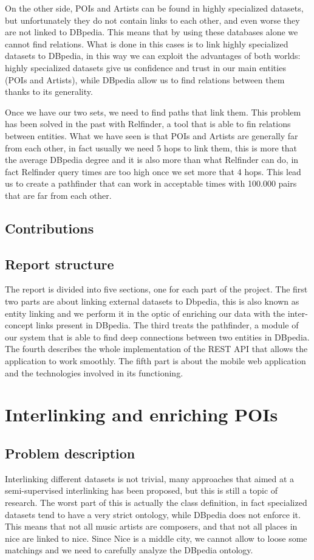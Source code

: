 On the other side, POIs and Artists can be found in highly specialized datasets, but unfortunately they do not contain links to each other, and even worse they are not linked to DBpedia. This means that by using these databases alone we cannot find relations.
What is done in this cases is to link highly specialized datasets to DBpedia, in this way we can exploit the advantages of both worlds: highly specialized datasets give us confidence and trust in our main entities (POIs and Artists), while DBpedia allow us to find relations between them thanks to its generality.

Once we have our two sets, we need to find paths that link them. This problem has been solved in the past with Relfinder, a tool that is able to fin relations between entities.
What we have seen is that POIs and Artists are generally far from each other, in fact usually we need 5 hops to link them, this is more that the average DBpedia degree and it is also more than what Relfinder can do, in fact Relfinder query times are too high once we set more that 4 hops. This lead us to create a pathfinder that can work in acceptable times with 100.000 pairs that are far from each other.

\subsection{Contributions}

\subsection{Report structure}
The report is divided into five sections, one for each part of the project. The first two parts are about linking external datasets to Dbpedia, this is also known as entity linking and we perform it in the optic of enriching our data with the inter-concept links present in DBpedia.
The third treats the pathfinder, a module of our system that is able to find deep connections between two entities in DBpedia.
The fourth describes the whole implementation of the REST API that allows the application to work smoothly.
The fifth part is about the mobile web application and the technologies involved in its functioning.

\section{Interlinking and enriching POIs}
\subsection{Problem description}
Interlinking different datasets is not trivial, many approaches that aimed at a semi-supervised interlinking has been proposed, but this is still a topic of research.
The worst part of this is actually the class definition, in fact specialized datasets tend to have a very strict ontology, while DBpedia does not enforce it. This means that not all music artists are composers, and that not all places in nice are linked to nice. Since Nice is a middle city, we cannot allow to loose some matchings and we need to carefully analyze the DBpedia ontology.

